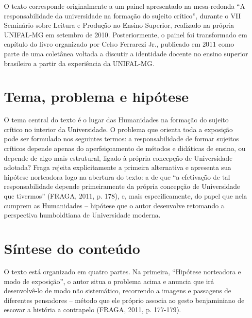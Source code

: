 \documentclass[12pt]{article}
\begin{document}
O texto corresponde originalmente a um painel apresentado na mesa-redonda
``A responsabilidade da universidade na formação do sujeito crítico'',
durante o VII Seminário sobre Leitura e Produção no Ensino Superior,
realizado na própria UNIFAL-MG em setembro de 2010. Posteriormente, o
painel foi transformado em capítulo do livro organizado por Celso Ferrarezi
Jr., publicado em 2011 como parte de uma coletânea voltada a discutir a
identidade docente no ensino superior brasileiro a partir da experiência da
UNIFAL-MG.

\section*{Tema, problema e hipótese}

O tema central do texto é o lugar das Humanidades na formação do sujeito
crítico no interior da Universidade. O problema que orienta toda a
exposição pode ser formulado nos seguintes termos: a responsabilidade de
formar sujeitos críticos depende apenas do aperfeiçoamento de métodos e
didáticas de ensino, ou depende de algo mais estrutural, ligado à própria
concepção de Universidade adotada? Fraga rejeita explicitamente a primeira
alternativa e apresenta sua hipótese norteadora logo na abertura do texto:
a de que ``a efetivação de tal responsabilidade depende primeiramente da
própria concepção de Universidade que tivermos'' (FRAGA, 2011, p. 178), e,
mais especificamente, do papel que nela cumprem as Humanidades -- hipótese
que o autor desenvolve retomando a perspectiva humboldtiana de Universidade
moderna.

\section*{Síntese do conteúdo}

O texto está organizado em quatro partes. Na primeira, ``Hipótese
norteadora e modo de exposição'', o autor situa o problema acima e anuncia
que irá desenvolvê-lo de modo não sistemático, recorrendo a imagens e
passagens de diferentes pensadores -- método que ele próprio associa ao
gesto benjaminiano de escovar a história a contrapelo (FRAGA, 2011, p.
177-179).
\end{document}
